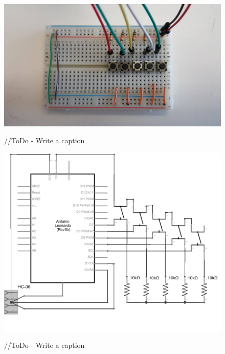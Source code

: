 \documentclass{article}
\begin{document}
	\begin{figure}[]
		\centering
		\label{breadboard}
		{\includegraphics[scale = 0.15]{breadboard}}
		\caption{//ToDo - Write a caption}
	\end{figure}
	
	\begin{figure}[]
		\centering
		\label{mediaController_schem}
		{\includegraphics{mediaController_schem}}
		\caption{//ToDo - Write a caption}
	\end{figure}
		
			
	
	
	

	\newpage
\end{document}
